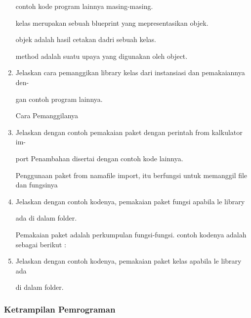 \begin{enumerate}
    contoh kode program lainnya masing-masing.

    kelas merupakan sebuah blueprint yang mepresentasikan objek.

    objek adalah hasil cetakan dadri sebuah kelas.

    method adalah suatu upaya yang digunakan oleh object.

    



    \item Jelaskan cara pemanggikan library kelas dari instansiasi dan pemakaiannya den-

    gan contoh program lainnya.

    Cara Pemanggilanya 

    



    \item Jelaskan dengan contoh pemakaian paket dengan perintah from kalkulator im-

    port Penambahan disertai dengan contoh kode lainnya.

    Penggunaan paket from namafile import, itu berfungsi untuk memanggil file dan fungsinya

    



    \item Jelaskan dengan contoh kodenya, pemakaian paket fungsi apabila 
le library

    ada di dalam folder.

    Pemakaian paket adalah perkumpulan fungsi-fungsi. contoh kodenya adalah sebagai berikut :



    \item Jelaskan dengan contoh kodenya, pemakaian paket kelas apabila 
le library ada

    di dalam folder.

    



\end{enumerate}

\subsubsection{Ketrampilan Pemrograman}

